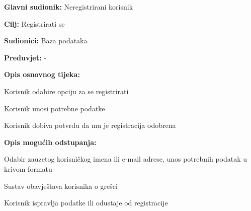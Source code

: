 					\noindent {}
					\begin{packed_item}
	
						\item \textbf{Glavni sudionik: } Neregistrirani korisnik
						\item  \textbf{Cilj:} Registrirati se
						\item  \textbf{Sudionici:} Baza podataka
						\item  \textbf{Preduvjet:} -
						\item  \textbf{Opis osnovnog tijeka:}
						
						\item[] \begin{packed_enum}
	
							\item Korisnik odabire opciju za se registrirati
							\item Korisnik unosi potrebne podatke
							\item Korisnik dobiva potvrdu da mu je registracija odobrena
						\end{packed_enum}
						
						\item  \textbf{Opis mogućih odstupanja:}
						
						\item[] \begin{packed_item}
	
							\item[2.a] Odabir zauzetog korisničkog imena ili e-mail adrese, unos potrebnih podatak u krivom formatu
							\item[] \begin{packed_enum}
								
								\item Sustav obavještava korisnika o grešci
								\item Korisnik ispravlja podatke ili odustaje od registracije
								
							\end{packed_enum}
							
						\end{packed_item}
					\end{packed_item}
				
